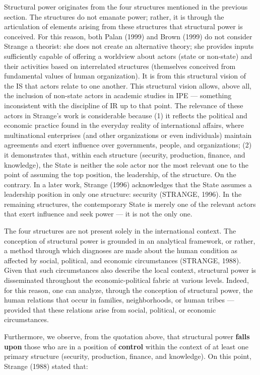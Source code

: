 Structural power originates from the four structures mentioned in the previous section. The structures do not emanate power; rather, it is through the articulation of elements arising from these structures that structural power is conceived. For this reason, both Palan (1999) and Brown (1999) do not consider Strange a theorist: she does not create an alternative theory; she provides inputs sufficiently capable of offering a worldview about actors (state or non-state) and their activities based on interrelated structures (themselves conceived from fundamental values of human organization). It is from this structural vision of the IS that actors relate to one another. This structural vision allows, above all, the inclusion of non-state actors in academic studies in IPE --- something inconsistent with the discipline of IR up to that point. The relevance of these actors in Strange's work is considerable because (1) it reflects the political and economic practice found in the everyday reality of international affairs, where multinational enterprises (and other organizations or even individuals) maintain agreements and exert influence over governments, people, and organizations; (2) it demonstrates that, within each structure (security, production, finance, and knowledge), the State is neither the sole actor nor the most relevant one to the point of assuming the top position, the leadership, of the structure. On the contrary. In a later work, Strange (1996) acknowledges that the State assumes a leadership position in only one structure: security (STRANGE, 1996). In the remaining structures, the contemporary State is merely one of the relevant actors that exert influence and seek power --- it is not the only one.

The four structures are not present solely in the international context. The conception of structural power is grounded in an analytical framework, or rather, a method through which diagnoses are made about the human condition as affected by social, political, and economic circumstances (STRANGE, 1988). Given that such circumstances also describe the local context, structural power is disseminated throughout the economic-political fabric at various levels. Indeed, for this reason, one can analyze, through the conception of structural power, the human relations that occur in families, neighborhoods, or human tribes --- provided that these relations arise from social, political, or economic circumstances.

Furthermore, we observe, from the quotation above, that structural power \textbf{falls upon} those who are in a position of \textbf{control} within the context of at least one primary structure (security, production, finance, and knowledge). On this point, Strange (1988) stated that:

